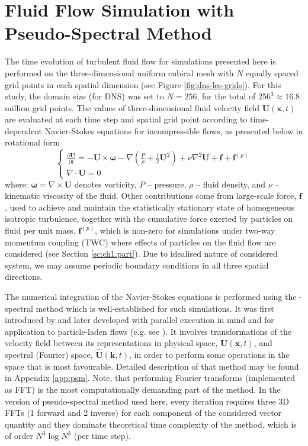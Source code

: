 \documentclass{pracamgren}
\begin{document}
\section{Fluid Flow Simulation with Pseudo-Spectral Method}
\label{sc:ch1.pspec}

The time evolution of turbulent fluid flow for simulations presented here is performed on the three-dimensional uniform cubical mesh with $N$ equally spaced grid points in each spatial dimension (see Figure \ref{fig:dns-les-grids}).
For this study, the domain size (for DNS) was set to $N=256$, for the total of $256^3 \approx 16.8$ million grid points.
The values of three-dimensional fluid velocity field $\mathbf{U}(\mathbf{x}, t)$ are evaluated at each time step and spatial grid point according to time-dependent Navier-Stokes equations for incompressible flows, as presented below in rotational form
\begin{equation}
  \left\{
  \begin{array}{ll}
  \frac{\partial \mathbf{U}}{\partial t} = - \mathbf{U} \times \boldsymbol{\omega} - \nabla \left( \frac{P}{\rho} + \frac{1}{2} \mathbf{U}^2 \right) + \nu \nabla^{2} \mathbf{U} + \mathbf{f} + \mathbf{f}^{(p)}\\
  \nabla \cdot \mathbf{U} = 0
  \end{array}
  \right.
  \label{eqn:n-s}
\end{equation}
where: $\boldsymbol{\omega} = \nabla \times \mathbf{U}$ denotes vorticity, $P$ -- pressure, $\rho$ -- fluid density, and $\nu$ -- kinematic viscosity of the fluid.
Other contributions come from large-scale force, $\mathbf{f}$, used to achieve and maintain the statistically stationary state of homogeneous isotropic turbulence, together with the cumulative force exerted by particles on fluid per unit mass, $\mathbf{f}^{(p)}$, which is non-zero for simulations under two-way momentum coupling (TWC) where effects of particles on the fluid flow are considered (see Section \ref{sc:ch1.part}).
Due to idealised nature of considered system, we may assume periodic boundary conditions in all three spatial directions.

The numerical integration of the Navier-Stokes equations is performed using the -spectral method which is well-established for such simulations.
It was first introduced by \textcite{Orszag1972} and later developed with parallel execution in mind and for application to particle-laden flows (e.g. see \textcite{Wang1993,Ayala2014,Parishani2015}).
It involves transformations of the velocity field between its representations in physical space, $\textbf{U}(\textbf{x}, t)$, and spectral (Fourier) space, $\hat{\textbf{U}}(\textbf{k}, t)$, in order to perform some operations in the space that is most favourable.
Detailed description of that method may be found in Appendix \ref{app:psm}.
Note, that performing Fourier transforms (implemented as FFT) is the most computationally demanding part of the method.
In the version of pseudo-spectral method used here, every iteration requires three 3D FFTs (1 forward and 2 inverse) for each component of the considered vector quantity and they dominate theoretical time complexity of the method, which is of order $N^3 \log N^3$ (per time step).
\end{document}
